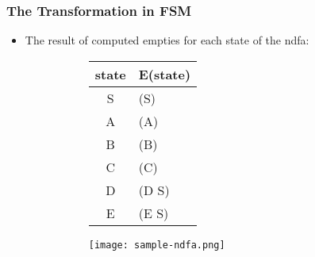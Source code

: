 \documentclass{beamer}
\begin{document}
\begin{frame}[fragile]
\frametitle{The Transformation in FSM}
\begin{scriptsize}
\begin{itemize}
\normalsize
\item<1->
The result of computed empties for each state of the ndfa:
\begin{figure}[t!]
\centering
\begin{subfigure}{0.3\textwidth}
\begin{center}
\begin{tabular}{|c|l|}
  \hline
  state & E(state) \\ \hline
  S & (S) \\ \hline
  A & (A) \\ \hline
  B & (B) \\ \hline
  C & (C) \\ \hline
  D & (D S) \\ \hline
  E & (E S) \\ \hline
\end{tabular}
\end{center}
\end{subfigure}
\hfill
\begin{subfigure}{0.5\textwidth}
\centering
\texttt{[image: sample-ndfa.png]}
\label{aa-ab}
\end{subfigure}
\end{figure}
\end{itemize}
\end{scriptsize}
\end{frame}
\end{document}
